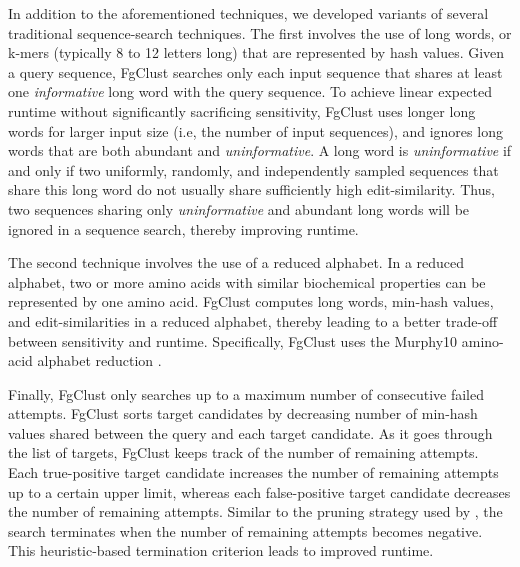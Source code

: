 \documentclass[11pt,letterpaper]{llncs2e/llncs}
\begin{document}
In addition to the aforementioned techniques, we developed variants of several traditional sequence-search techniques.
The first involves the use of long words, or k-mers (typically 8 to 12 letters long) that are represented by hash values.
Given a query sequence, FgClust searches only each input sequence that shares at least one \textit{informative} long word with the query sequence.
To achieve linear expected runtime without significantly sacrificing sensitivity, FgClust uses longer long words for larger input size (i.e, the number of input sequences), and ignores long words that are both abundant and \textit{uninformative}.
A long word is \textit{uninformative} if and only if two uniformly, randomly, and independently sampled sequences that share this long word do not usually share sufficiently high edit-similarity.
Thus, two sequences sharing only \textit{uninformative} and abundant long words will be ignored in a sequence search, thereby improving runtime.

The second technique involves the use of a reduced alphabet. 
In a reduced alphabet, two or more amino acids with similar biochemical properties can be represented by one amino acid.
FgClust computes long words, min-hash values, and edit-similarities in a reduced alphabet, thereby leading to a better trade-off between sensitivity and runtime.
Specifically, FgClust uses the Murphy10 amino-acid alphabet reduction \citep{murphy2000simplified}.

Finally, FgClust only searches up to a maximum number of consecutive failed attempts.
FgClust sorts target candidates by decreasing number of min-hash values shared between the query and each target candidate.
As it goes through the list of targets, FgClust keeps track of the number of remaining attempts.
Each true-positive target candidate increases the number of remaining attempts up to a certain upper limit, whereas each false-positive target candidate decreases the number of remaining attempts.
Similar to the pruning strategy used by \citet{edgar2010search}, the search terminates when the number of remaining attempts becomes negative.
This heuristic-based termination criterion leads to improved runtime.
\end{document}
